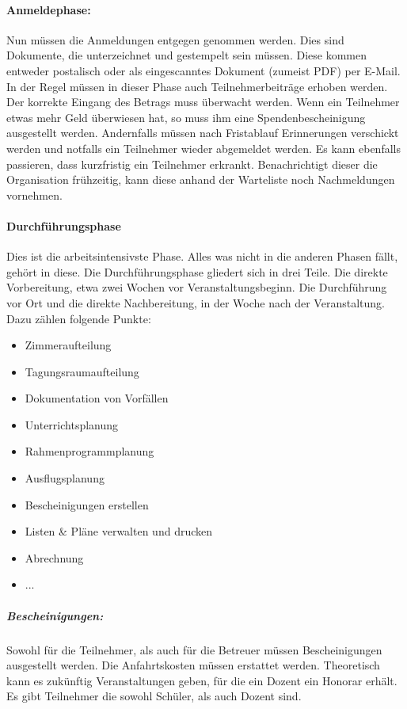 \documentclass[a4paper]{scrartcl}
\begin{document}
	\paragraph{Anmeldephase:}
	Nun müssen die Anmeldungen entgegen genommen werden. Dies sind Dokumente, die unterzeichnet und gestempelt sein müssen. Diese kommen entweder postalisch oder als eingescanntes Dokument (zumeist PDF) per E-Mail. In der Regel müssen in dieser Phase auch Teilnehmerbeiträge erhoben werden. Der korrekte Eingang des Betrags muss überwacht werden. Wenn ein Teilnehmer etwas mehr Geld überwiesen hat, so muss ihm eine Spendenbescheinigung ausgestellt werden. Andernfalls müssen nach Fristablauf Erinnerungen verschickt werden und notfalls ein Teilnehmer wieder abgemeldet werden. Es kann ebenfalls passieren, dass kurzfristig ein Teilnehmer erkrankt. Benachrichtigt dieser die Organisation frühzeitig, kann diese anhand der Warteliste noch Nachmeldungen vornehmen.
	
	\paragraph{Durchführungsphase}
	Dies ist die arbeitsintensivste Phase. Alles was nicht in die anderen Phasen fällt, gehört in diese. Die Durchführungsphase gliedert sich in drei Teile. Die direkte Vorbereitung, etwa zwei Wochen vor Veranstaltungsbeginn. Die Durchführung vor Ort und die direkte Nachbereitung, in der Woche nach der Veranstaltung. Dazu zählen folgende Punkte:
	
	\begin{itemize}
		\item Zimmeraufteilung
		\item Tagungsraumaufteilung
		\item Dokumentation von Vorfällen
		\item Unterrichtsplanung
		\item Rahmenprogrammplanung
		\item Ausflugsplanung
		\item Bescheinigungen erstellen
		\item Listen \& Pläne verwalten und drucken
		\item Abrechnung
		\item ...
	\end{itemize}
	
	\subparagraph{Bescheinigungen:}
	Sowohl für die Teilnehmer, als auch für die Betreuer müssen Bescheinigungen ausgestellt werden. Die Anfahrtskosten müssen erstattet werden. Theoretisch kann es zukünftig Veranstaltungen geben, für die ein Dozent ein Honorar erhält. Es gibt Teilnehmer die sowohl Schüler, als auch Dozent sind.
	
\end{document}

